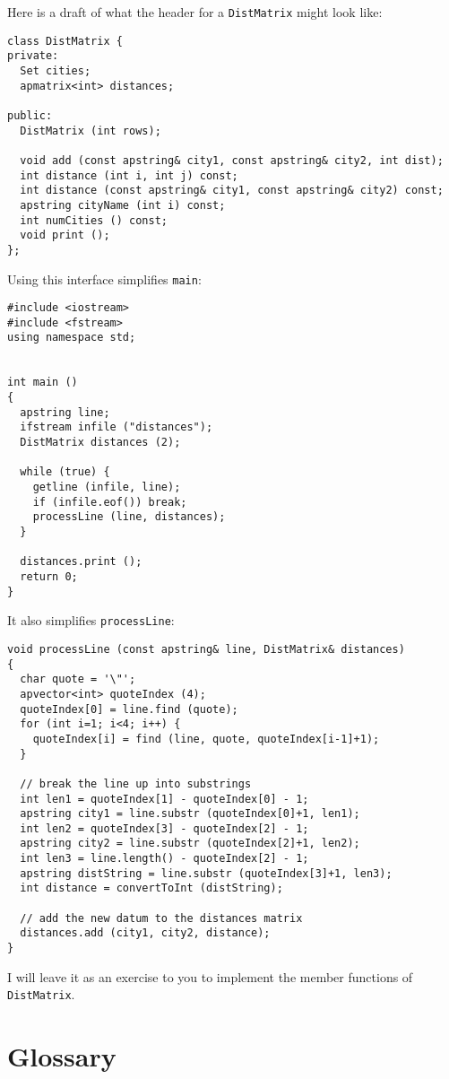 Here is a draft of what the header for a {\tt DistMatrix}
might look like:

\begin{verbatim}
class DistMatrix {
private:
  Set cities;
  apmatrix<int> distances;

public:
  DistMatrix (int rows);

  void add (const apstring& city1, const apstring& city2, int dist);
  int distance (int i, int j) const;
  int distance (const apstring& city1, const apstring& city2) const;
  apstring cityName (int i) const;
  int numCities () const;
  void print ();
};
\end{verbatim}
%
Using this interface simplifies {\tt main}:

\begin{verbatim}
#include <iostream>
#include <fstream>
using namespace std;


int main ()
{
  apstring line;
  ifstream infile ("distances");
  DistMatrix distances (2);

  while (true) {
    getline (infile, line);
    if (infile.eof()) break;
    processLine (line, distances);
  }

  distances.print ();
  return 0;
}
\end{verbatim}
%
It also simplifies {\tt processLine}:

\begin{verbatim}
void processLine (const apstring& line, DistMatrix& distances)
{
  char quote = '\"';
  apvector<int> quoteIndex (4);
  quoteIndex[0] = line.find (quote);
  for (int i=1; i<4; i++) {
    quoteIndex[i] = find (line, quote, quoteIndex[i-1]+1);
  }

  // break the line up into substrings
  int len1 = quoteIndex[1] - quoteIndex[0] - 1;
  apstring city1 = line.substr (quoteIndex[0]+1, len1);
  int len2 = quoteIndex[3] - quoteIndex[2] - 1;
  apstring city2 = line.substr (quoteIndex[2]+1, len2);
  int len3 = line.length() - quoteIndex[2] - 1;
  apstring distString = line.substr (quoteIndex[3]+1, len3);
  int distance = convertToInt (distString);

  // add the new datum to the distances matrix
  distances.add (city1, city2, distance);
}
\end{verbatim}
%
I will leave it as an exercise to you to implement the
member functions of {\tt DistMatrix}.


\section{Glossary}

